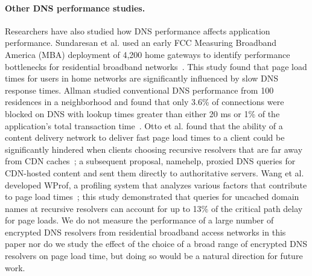 \paragraph{Other DNS performance studies.} Researchers have also studied how
DNS performance affects application performance.  Sundaresan et al. used an
early FCC Measuring Broadband America (MBA) deployment of 4,200 home gateways
to identify performance bottlenecks for residential broadband
networks~\cite{sundaresan2013measuring}.  This study found that page load
times for users in home networks are significantly influenced by slow DNS
response times.  Allman studied conventional DNS performance from 100
residences in a neighborhood and found that only 3.6\% of connections were
blocked on DNS with lookup times greater than either 20 ms or 1\% of the
application's total transaction time~\cite{allman2020putting}. Otto et al.
found that the ability of a content delivery network to deliver fast page load
times to a client could be significantly hindered when clients choosing
recursive resolvers that are far away from CDN caches~\cite{otto2012content};
a subsequent proposal, namehelp, proxied DNS queries for CDN-hosted content
and sent them directly to authoritative servers.  Wang et al. developed WProf,
a profiling system that analyzes various factors that contribute to page load
times~\cite{wang2013demystifying}; this study demonstrated that queries for
uncached domain names at recursive resolvers can account for up to 13\% of the
critical path delay for page loads.  We do not measure the performance of a
large number of encrypted DNS resolvers from residential broadband access
networks in this paper nor do we study the effect of the choice of a broad
range of encrypted DNS resolvers on page load time, but doing so would be a
natural direction for future work.  


